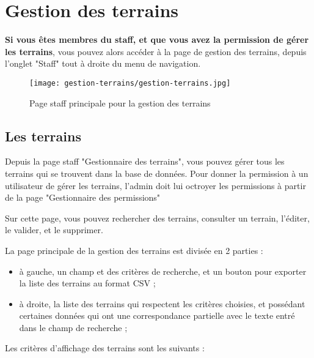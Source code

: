 \section{Gestion des terrains}

\textbf{Si vous êtes membres du staff, et que vous avez la permission de gérer les terrains}, vous pouvez alors accéder à la page de gestion des terrains, depuis l'onglet "Staff" tout à droite du menu de navigation.

\begin{figure}[H]
\centering
\texttt{[image: gestion-terrains/gestion-terrains.jpg]}
\caption{Page staff principale pour la gestion des terrains}
\end{figure}

\subsection{Les terrains}

Depuis la page staff "Gestionnaire des terrains", vous pouvez gérer tous les terrains qui se trouvent dans la base de données. Pour donner la permission à un utilisateur de gérer les terrains, l'admin doit lui octroyer les permissions à partir de la page "Gestionnaire des permissions"

\bigskip

Sur cette page, vous pouvez rechercher des terrains, consulter un terrain, l'éditer, le valider, et le supprimer.\newline

La page principale de la gestion des terrains est divisée en 2 parties :

\begin{itemize}
\item  à gauche, un champ et des critères de recherche, et un bouton pour exporter la liste des terrains au format CSV ;
\item à droite, la liste des terrains qui respectent les critères choisies, et possédant certaines données qui ont une correspondance partielle avec le texte entré dans le champ de recherche ;
\end{itemize}
\bigskip

Les critères d'affichage des terrains sont les suivants :

